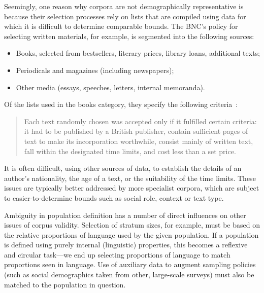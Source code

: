 Seemingly, one reason why corpora are not demographically representative is because their selection processes rely on lists that are compiled using data for which it is difficult to determine comparable bounds.  The BNC's policy for selecting written materials, for example, is segmented into the following sources:

\begin{itemize}
 \item Books, selected from bestsellers, literary prices, library loans, additional texts;
 \item Periodicals and magazines (including newspapers);
 \item Other media (essays, speeches, letters, internal memoranda).
\end{itemize}

Of the lists used in the books category, they specify the following criteria~\cite[p. 9]{burnard1995users}:

\begin{quote}
Each text randomly chosen was accepted only if it fulfilled certain criteria: it had to be published by a British publisher, contain sufficient pages of text to make its incorporation worthwhile, consist mainly of written text, fall within the designated time limits, and cost less than a set price.
\end{quote}

It is often difficult, using other sources of data, to establish the details of an author's nationality, the age of a text, or the suitability of the time limits\cite{dollinger2006oh}.
These issues are typically better addressed by more specialist corpora, which are subject to easier-to-determine bounds such as social role, context or text type\cite{kucera2002czech,przepiorkowski2008towards,kyto1993manual}.

Ambiguity in population definition has a number of direct influences on other issues of corpus validity. Selection of stratum sizes, for example, must be based on the relative proportions of language used by the given population.  If a population is defined using purely internal (linguistic) properties, this becomes a reflexive and circular task---we end up selecting proportions of language to match proportions seen in language.  Use of auxiliary data to augment sampling policies (such as social demographics taken from other, large-scale surveys) must also be matched to the population in question.


